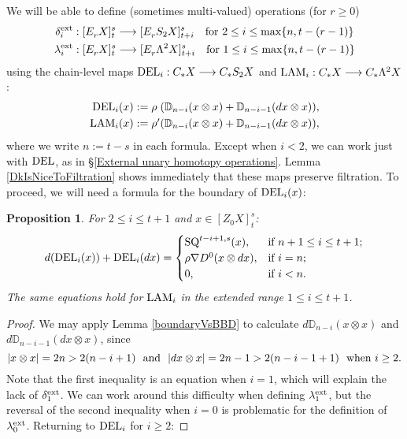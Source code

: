 \documentclass[11pt]{amsart} \renewcommand{\baselinestretch}{1.4}
\theoremstyle{plain}
\newtheorem{prop}[thm]{Proposition}
\theoremstyle{definition}
\renewcommand{\to}{\longrightarrow}
\newcommand{\Nabla}{\nabla}
\newcommand{\Edownup}[5]{[E_{#1}^{#2}#3]^{#4}_{#5}}
\newcommand{\EZdownup}[5]{[Z^{#2}_{#1}#3]^{#4}_{#5}}
\renewcommand{\mapsto}{\longmapsto}
\begin{document}
\begin{second quadrant homotopy sseq operations}
We will be able to define (sometimes multi-valued) operations (for $r\geq 0$)
\begin{gather*}
\delta^\textup{ext}_i:\Edownup{r}{}{X}{s}{t}\to \Edownup{r}{}{S_2X}{s}{t+i}\textup{\ \ \ for $2\leq i\leq\max\{n,t-(r-1)\}$}\\
\lambda^\textup{ext}_i:\Edownup{r}{}{X}{s}{t}\to \Edownup{r}{}{\Lambda^2X}{s}{t+i}\textup{\ \ \ for $1\leq i\leq\max\{n,t-(r-1)\}$}
\end{gather*}
using the chain-level maps $\textup{DEL}_{i}:C_*X\to C_*S_2X$ and $\textup{LAM}_{i}:C_*X\to C_*\Lambda^2X$:
\begin{alignat*}{2}
\textup{DEL}_{i}(x)&:=\makebox[\widthof{$\rho'$}][l]{$\rho$}(\mathbb{D}_{n-i}(x\otimes x)+\mathbb{D}_{n-i-1}(dx\otimes x)),\\
\textup{LAM}_{i}(x)&:=\makebox[\widthof{$\rho'$}][l]{$\rho'$}(\mathbb{D}_{n-i}(x\otimes x)+\mathbb{D}_{n-i-1}(dx\otimes x)),
\end{alignat*}
where we write $n:=t-s$ in each formula. Except when $i<2$, we  can work just with $\textup{DEL}$, as in \S\ref{External unary homotopy operations}. Lemma \ref{DkIsNiceToFiltration} shows immediately that these maps  preserve filtration. 
To proceed, we will need a formula for the boundary of $\textup{DEL}_i(x)$:
\begin{prop}
\label{dvsDEL}
For $2\leq i\leq t+1$ and $x\in \EZdownup{0}{}{X}{s}{t}$:
\[d(\textup{DEL}_i(x))+ \textup{DEL}_i(dx)=\begin{cases}
\textup{SQ}^{t-i+1,s}(x),&\textup{if }n+1\leq i \leq t+1;\\
\rho\Nabla D^0(x\otimes dx),&\textup{if }i=n;\\
0,&\textup{if }i< n.
\end{cases}\]
The same equations hold for $\textup{LAM}_i$ in the extended range $1\leq i\leq t+1$.
\end{prop}
\begin{proof}
We may apply Lemma \ref{boundaryVsBBD} to calculate $d\mathbb{D}_{n-i}(x\otimes x)$ and $d\mathbb{D}_{n-i-1}(dx\otimes x)$, since 
\[|x\otimes x|=2n> 2(n-i+1)\textup{ \ and \ }|dx\otimes x|=2n-1> 2(n-i-1+1) \textup{ \ when $i\geq2$}.\]
Note that the first inequality is an equation when  $i=1$, which will explain the lack of $\delta^\textup{ext}_1$. We can work around this difficulty when defining $\lambda^\textup{ext}_1$, but the reversal of the second inequality when $i=0$ is problematic for the definition of $\lambda^\textup{ext}_0$. Returning to $\textup{DEL}_i$ for $i\geq2$:

\end{proof}
\end{second quadrant homotopy sseq operations}
\end{document}

